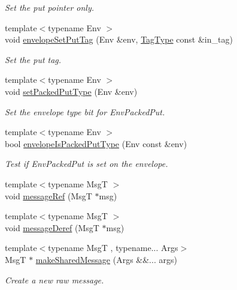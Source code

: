 \begin{DoxyCompactItemize}
\begin{DoxyCompactList}\small\item\em Set the put pointer only. \end{DoxyCompactList}\item 
{\footnotesize template$<$typename Env $>$ }\\void \hyperlink{namespacevt_a43128d4858572c9b60cfc1c420acc882}{envelope\+Set\+Put\+Tag} (Env \&env, \hyperlink{namespacevt_a84ab281dae04a52a4b243d6bf62d0e52}{Tag\+Type} const \&in\+\_\+tag)
\begin{DoxyCompactList}\small\item\em Set the put tag. \end{DoxyCompactList}\item 
{\footnotesize template$<$typename Env $>$ }\\void \hyperlink{namespacevt_a2206947364b94e9c7dba38df257d095b}{set\+Packed\+Put\+Type} (Env \&env)
\begin{DoxyCompactList}\small\item\em Set the envelope type bit for {\ttfamily Env\+Packed\+Put}. \end{DoxyCompactList}\item 
{\footnotesize template$<$typename Env $>$ }\\bool \hyperlink{namespacevt_aba8a23bc60c8177816d94e913aed6107}{envelope\+Is\+Packed\+Put\+Type} (Env const \&env)
\begin{DoxyCompactList}\small\item\em Test if {\ttfamily Env\+Packed\+Put} is set on the envelope. \end{DoxyCompactList}\item 
{\footnotesize template$<$typename MsgT $>$ }\\void \hyperlink{namespacevt_aa4a692a62fffd91e7e708d8047897a60}{message\+Ref} (MsgT $\ast$msg)
\item 
{\footnotesize template$<$typename MsgT $>$ }\\void \hyperlink{namespacevt_a85f2aa61b92eeeedc61654cd4865b2a9}{message\+Deref} (MsgT $\ast$msg)
\item 
{\footnotesize template$<$typename MsgT , typename... Args$>$ }\\MsgT $\ast$ \hyperlink{namespacevt_a6c87ed02a655497ee05109f3c50374fd}{make\+Shared\+Message} (Args \&\&... args)
\begin{DoxyCompactList}\small\item\em Create a new \textquotesingle{}raw\textquotesingle{} message. \end{DoxyCompactList}\item 

\end{DoxyCompactItemize}
